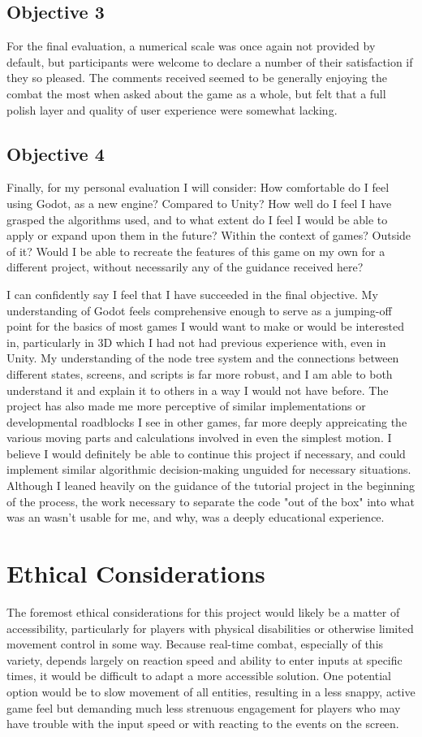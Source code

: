 \documentclass[10pt,twocolumn]{article}
\begin{document}
\subsection{Objective 3}
For the final evaluation, a numerical scale was once again not provided by default, but participants were welcome to declare a number of their satisfaction if they so pleased. The comments received seemed to be generally enjoying the combat the most when asked about the game as a whole, but felt that a full polish layer and quality of user experience were somewhat lacking. 

\subsection{Objective 4}
Finally, for my personal evaluation I will consider:
How comfortable do I feel using Godot, as a new engine? Compared to Unity? How well do I feel I have grasped the algorithms used, and to what extent do I feel I would be able to apply or expand upon them in the future? Within the context of games? Outside of it? Would I be able to recreate the features of this game on my own for a different project, without necessarily any of the guidance received here?

I can confidently say I feel that I have succeeded in the final objective. My understanding of Godot feels comprehensive enough to serve as a jumping-off point for the basics of most games I would want to make or would be interested in, particularly in 3D which I had not had previous experience with, even in Unity. My understanding of the node tree system and the connections between different states, screens, and scripts is far more robust, and I am able to both understand it and explain it to others in a way I would not have before. The project has also made me more perceptive of similar implementations or developmental roadblocks I see in other games, far more deeply appreicating the various moving parts and calculations involved in even the simplest motion. I believe I would definitely be able to continue this project if necessary, and could implement similar algorithmic decision-making unguided for necessary situations. Although I leaned heavily on the guidance of the tutorial project in the beginning of the process, the work necessary to separate the code "out of the box" into what was an wasn't usable for me, and why, was a deeply educational experience.

\section{Ethical Considerations}
The foremost ethical considerations for this project would likely be a matter of accessibility, particularly for players with physical disabilities or otherwise limited movement control in some way. Because real-time combat, especially of this variety, depends largely on reaction speed and ability to enter inputs at specific times, it would be difficult to adapt a more accessible solution. One potential option would be to slow movement of all entities, resulting in a less snappy, active game feel but demanding much less strenuous engagement for players who may have trouble with the input speed or with reacting to the events on the screen. 
\end{document}
